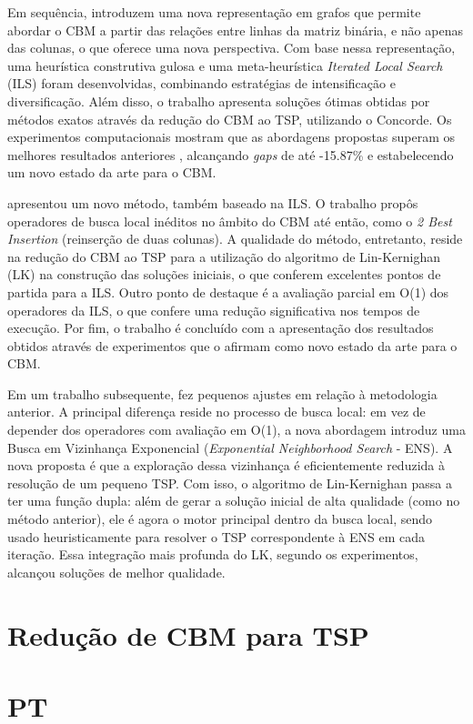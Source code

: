 Em sequência,  introduzem uma nova representação em grafos que permite abordar o CBM a partir das relações entre linhas da matriz binária, e não apenas das colunas, o que oferece uma nova perspectiva. Com base nessa representação, uma heurística construtiva gulosa e uma meta-heurística \textit{Iterated Local Search} (ILS) \cite{lourencco2003iterated} foram desenvolvidas, combinando estratégias de intensificação e diversificação. Além disso, o trabalho apresenta soluções ótimas obtidas por métodos exatos através da redução do CBM ao TSP, utilizando o Concorde. Os experimentos computacionais mostram que as abordagens propostas superam os melhores resultados anteriores \cite{HADDADI2015612}, alcançando \textit{gaps} de até -15.87\% e estabelecendo um novo estado da arte para o CBM.

 apresentou um novo método, também baseado na ILS. O trabalho propôs operadores de busca local inéditos no âmbito do CBM até então, como o \textit{2 Best Insertion} (reinserção de duas colunas). A qualidade do método, entretanto, reside na redução do CBM ao TSP para a utilização do algoritmo de Lin-Kernighan (LK) \cite{helsgaun2000effective} na construção das soluções iniciais, o que conferem excelentes pontos de partida para a ILS. Outro ponto de destaque é a avaliação parcial em O(1) dos operadores da ILS, o que confere uma redução significativa nos tempos de execução. Por fim, o trabalho é concluído com a apresentação dos resultados obtidos através de experimentos que o afirmam como novo estado da arte para o CBM.

Em um trabalho subsequente,  fez pequenos ajustes em relação à metodologia anterior. A principal diferença reside no processo de busca local: em vez de depender dos operadores com avaliação em O(1), a nova abordagem introduz uma Busca em Vizinhança Exponencial (\textit{Exponential Neighborhood Search} - ENS). A nova proposta é que a exploração dessa vizinhança é eficientemente reduzida à resolução de um pequeno TSP. Com isso, o algoritmo de Lin-Kernighan passa a ter uma função dupla: além de gerar a solução inicial de alta qualidade (como no método anterior), ele é agora o motor principal dentro da busca local, sendo usado heuristicamente para resolver o TSP correspondente à ENS em cada iteração. Essa integração mais profunda do LK, segundo os experimentos, alcançou soluções de melhor qualidade.

\section{Redução de CBM para TSP}

\section{PT}